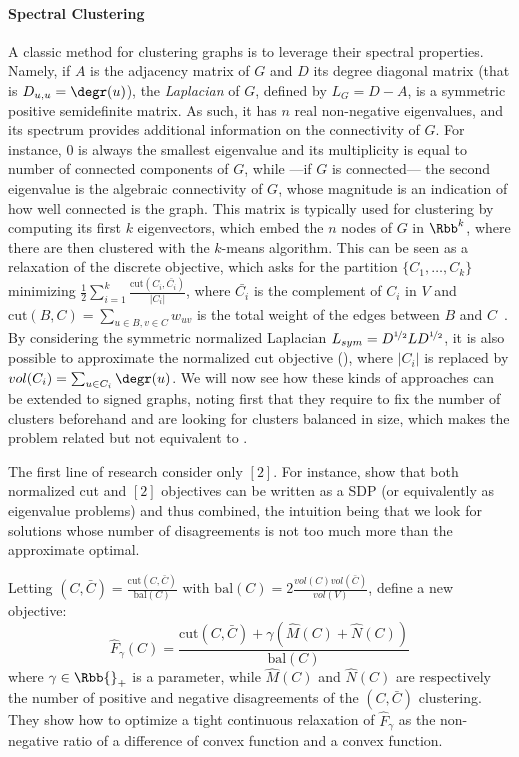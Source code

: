 \paragraph{Spectral Clustering}
\label{par:cc_spectral}

A classic method for clustering graphs is to leverage their spectral properties. Namely, if $A$ is
the adjacency matrix of $G$ and $D$ its degree diagonal matrix (that is $D_{u,u} = \degr(u)$), the
\emph{Laplacian} of $G$, defined by $L_G = D - A$, is a symmetric positive semidefinite matrix. As
such, it has $n$ real non-negative eigenvalues, and its spectrum provides additional information on
the connectivity of $G$. For instance, $0$ is always the smallest eigenvalue and its multiplicity is
equal to number of connected components of $G$, while ---if $G$ is connected--- the second
eigenvalue is the algebraic connectivity of $G$, whose magnitude is an indication of how well
connected is the graph. This matrix is typically used for clustering by computing its first $k$
eigenvectors, which embed the $n$ nodes of $G$ in $\Rbb^k$, where there are then clustered with the
$k$-means algorithm. This can be seen as a relaxation of the discrete \rcut{} objective, which asks
for the partition $\{C_1, \ldots, C_k\}$ minimizing $\frac{1}{2}\sum_{i=1}^k \frac{\mathrm{cut}(C_i,
\bar{C_i})}{|C_i|}$, where $\bar{C_i}$ is the complement of $C_i$ in $V$ and $\mathrm{cut}(B, C) =
\sum_{u\in B, v\in C} w_{uv}$ is the total weight of the edges between $B$ and
$C$~\autocite{tutoSpectralClustering07}. By considering the symmetric normalized Laplacian
$L_{sym}  = D^{\nicefrac{1}{2}}LD^{\nicefrac{1}{2}}$, it is also possible to approximate the
normalized cut objective (\ncut{}), where $|C_i|$ is replaced by $vol(C_i) = \sum_{u\in C_i}
\degr(u)$. We will now see how these kinds of approaches can be extended to signed graphs, noting
first that they require to fix the number of clusters beforehand and are looking for clusters
balanced in size, which makes the problem related but not equivalent to \pcc{}.

The first line of research consider only \mind{}$[2]$. For instance, \textcite{NcutAnd2CC08} show
that both normalized cut and \mind{}$[2]$ objectives can be written as a SDP (or equivalently as
eigenvalue problems) and thus combined, the intuition being that we look for \ncut{} solutions whose
number of disagreements is not too much more than the approximate optimal.

Letting \ncut{}$(C, \bar{C}) = \frac{\mathrm{cut}(C, \bar{C})}{\mathrm{bal}(C)}$ with
$\mathrm{bal}(C) = 2\frac{vol(C)vol(\bar{C})}{vol(V)}$, \textcite{mOneCC12} define a new objective:
\begin{equation*}
  \hat{F}_\gamma(C) = \frac{\mathrm{cut}(C, \bar{C}) + \gamma\left(\hat{M}(C)+\hat{N}(C)\right)}{\mathrm{bal}(C)}
\end{equation*}
where $\gamma \in \Rbb{}_+$ is a parameter, while $\hat{M}(C)$ and $\hat{N}(C)$ are respectively the
number of positive and negative disagreements of the $(C, \bar{C})$ clustering.
They show how to optimize a tight continuous relaxation of $\hat{F}_\gamma$ as the non-negative
ratio of a difference of convex function and a convex function.

